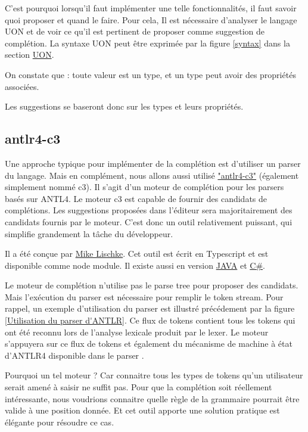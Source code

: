 \documentclass[
    iict, %
    il, %
]{heig-tb}
\begin{document}
C'est pourquoi lorsqu'il faut implémenter une telle fonctionnalités, il faut savoir quoi proposer et quand le faire.
Pour cela, Il est nécessaire d'analyser le langage UON et de voir ce qu'il est pertinent de proposer comme suggestion de complétion.
La syntaxe UON peut être exprimée par la figure \ref{syntax} dans la section \hyperref[UON]{UON}.

On constate que : toute valeur est un type, et un type peut avoir des propriétés associées.

Les suggestions se baseront donc sur les types et leurs propriétés.

\subsection{antlr4-c3}

Une approche typique pour implémenter de la complétion est d'utiliser un parser du langage.
Mais en complément, nous allons aussi utilisé \href{https://github.com/mike-lischke/antlr4-c3}{"antlr4-c3"} (également simplement nommé c3).
Il s'agit d'un moteur de complétion pour les parsers basés sur ANTL4. Le moteur c3 est capable de fournir des candidats de complétions.
Les suggestions proposées dans l'éditeur sera majoritairement des candidats fournis par le moteur. C'est donc un outil relativement puissant, qui simplifie grandement la tâche du développeur.

Il a été conçue par \href{https://github.com/mike-lischke}{Mike Lischke}. Cet outil est écrit en Typescript et est disponible comme node module. Il existe aussi en version \href{https://github.com/mike-lischke/antlr4-c3/tree/master/ports/java}{JAVA} et \href{https://github.com/mike-lischke/antlr4-c3/tree/master/ports/c%23}{C\#}.

Le moteur de complétion n'utilise pas le parse tree pour proposer des candidats. Mais l'exécution du parser est nécessaire pour remplir le token stream. Pour rappel, un exemple d'utilisation du parser est illustré précédement par la figure \ref{Utilisation du parser d'ANTLR}.
Ce flux de tokens contient tous les tokens qui ont été reconnu lors de l'analyse lexicale produit par le lexer.
Le moteur s'appuyera sur ce flux de tokens et également du mécanisme de machine à état d'ANTLR4 disponible dans le parser \cite{antlr-mega-tutorial}.

Pourquoi un tel moteur ?
Car connaitre tous les types de tokens qu'un utilisateur serait amené à saisir ne suffit pas. Pour que la complétion soit réellement intéressante, nous voudrions connaitre quelle règle de la grammaire pourrait être valide à une position donnée.
Et cet outil apporte une solution pratique est élégante pour résoudre ce cas.
\end{document}
